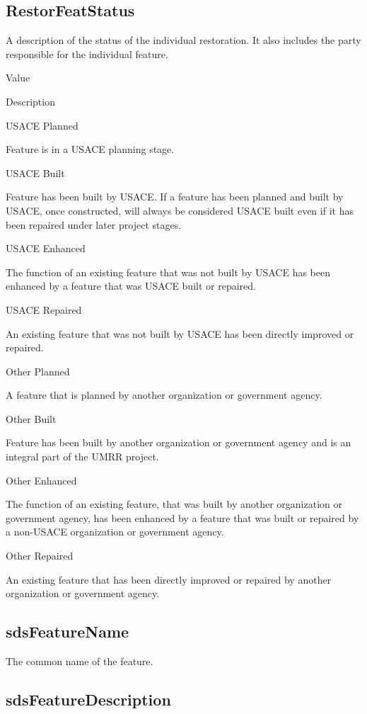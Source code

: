 \documentclass[
  letterpaper,
  DIV=11,
  numbers=noendperiod]{scrreprt}
\begin{document}
\subsection{RestorFeatStatus}\label{restorfeatstatus-20}

A description of the status of the individual restoration. It also
includes the party responsible for the individual feature.

Value

Description

USACE Planned

Feature is in a USACE planning stage.

USACE Built

Feature has been built by USACE. If a feature has been planned and built
by USACE, once constructed, will always be considered USACE built even
if it has been repaired under later project stages.

USACE Enhanced

The function of an existing feature that was not built by USACE has been
enhanced by a feature that was USACE built or repaired.

USACE Repaired

An existing feature that was not built by USACE has been directly
improved or repaired.

Other Planned

A feature that is planned by another organization or government agency.

Other Built

Feature has been built by another organization or government agency and
is an integral part of the UMRR project.

Other Enhanced

The function of an existing feature, that was built by another
organization or government agency, has been enhanced by a feature that
was built or repaired by a non-USACE organization or government agency.

Other Repaired

An existing feature that has been directly improved or repaired by
another organization or government agency.

\subsection{sdsFeatureName}\label{sdsfeaturename-20}

The common name of the feature.

\subsection{sdsFeatureDescription}\label{sdsfeaturedescription-20}
\end{document}
